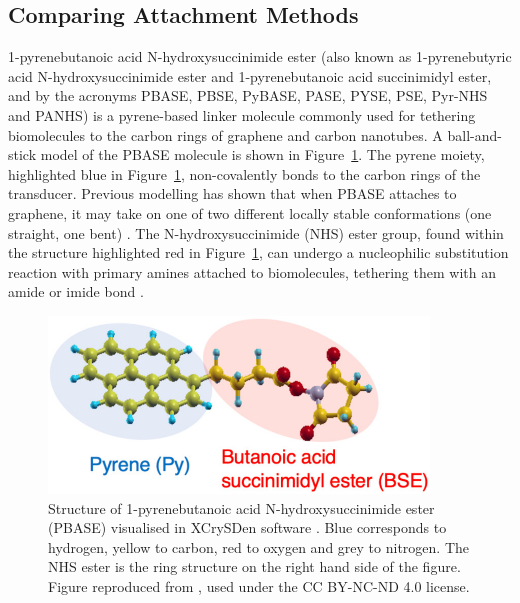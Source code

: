 \documentclass[
  a4paper,
]{scrbook}
\begin{document}
\hypertarget{sec-PBASE-attachment}{%
\subsection{Comparing Attachment Methods}\label{sec-PBASE-attachment}}

1-pyrenebutanoic acid N-hydroxysuccinimide ester (also known as
1-pyrenebutyric acid N-hydroxysuccinimide ester and 1-pyrenebutanoic
acid succinimidyl ester, and by the acronyms PBASE, PBSE, PyBASE, PASE,
PYSE, PSE, Pyr-NHS and PANHS) is a pyrene-based linker molecule commonly
used for tethering biomolecules to the carbon rings of graphene and
carbon nanotubes. A ball-and-stick model of the PBASE molecule is shown
in Figure~\ref{fig-pbase-structure}. The pyrene moiety, highlighted blue
in Figure~\ref{fig-pbase-structure}, non-covalently bonds to the carbon
rings of the transducer. Previous modelling has shown that when PBASE
attaches to graphene, it may take on one of two different locally stable
conformations (one straight, one bent) \autocite{Oishi2022}. The
N-hydroxysuccinimide (NHS) ester group, found within the structure
highlighted red in Figure~\ref{fig-pbase-structure}, can undergo a
nucleophilic substitution reaction with primary amines attached to
biomolecules, tethering them with an amide or imide bond
\autocite{Chen2001,Hermanson2013-16,Hermanson2013-3,Shkodra2021,Mishyn2022}.

\begin{figure}

{\centering \includegraphics[width=0.9\textwidth,height=\textheight]{figures/ch6/PBASE_edit.png}

}

\caption[Structure of 1-pyrenebutanoic acid N-hydroxysuccinimide ester
(PBASE).]{\label{fig-pbase-structure}Structure of 1-pyrenebutanoic acid
N-hydroxysuccinimide ester (PBASE) visualised in XCrySDen software
\autocite{Kokalj1999}. Blue corresponds to hydrogen, yellow to carbon,
red to oxygen and grey to nitrogen. The NHS ester is the ring structure
on the right hand side of the figure. Figure reproduced from
\autocite{Oishi2022}, used under the CC BY-NC-ND 4.0 license.}

\end{figure}
\end{document}
